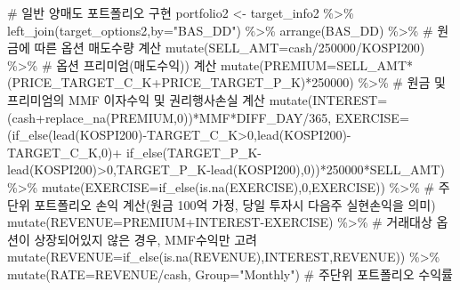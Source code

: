 \documentclass[
  a4paper,
  DIV=11,
  numbers=noendperiod]{scrreprt}
\newenvironment{Shaded}{\begin{snugshade}}{\end{snugshade}}
\newcommand{\AttributeTok}[1]{\textcolor[rgb]{0.40,0.45,0.13}{#1}}
\newcommand{\CommentTok}[1]{\textcolor[rgb]{0.37,0.37,0.37}{#1}}
\newcommand{\DecValTok}[1]{\textcolor[rgb]{0.68,0.00,0.00}{#1}}
\newcommand{\FunctionTok}[1]{\textcolor[rgb]{0.28,0.35,0.67}{#1}}
\newcommand{\NormalTok}[1]{\textcolor[rgb]{0.00,0.23,0.31}{#1}}
\newcommand{\OtherTok}[1]{\textcolor[rgb]{0.00,0.23,0.31}{#1}}
\newcommand{\SpecialCharTok}[1]{\textcolor[rgb]{0.37,0.37,0.37}{#1}}
\newcommand{\StringTok}[1]{\textcolor[rgb]{0.13,0.47,0.30}{#1}}
\begin{document}
\begin{Shaded}
\begin{Highlighting}[]
\CommentTok{\# 일반 양매도 포트폴리오 구현}
\NormalTok{portfolio2 }\OtherTok{\textless{}{-}}\NormalTok{ target\_info2 }\SpecialCharTok{\%\textgreater{}\%} 
  \FunctionTok{left\_join}\NormalTok{(target\_options2,}\AttributeTok{by=}\StringTok{"BAS\_DD"}\NormalTok{) }\SpecialCharTok{\%\textgreater{}\%} 
  \FunctionTok{arrange}\NormalTok{(BAS\_DD) }\SpecialCharTok{\%\textgreater{}\%} 
  \CommentTok{\# 원금에 따른 옵션 매도수량 계산}
  \FunctionTok{mutate}\NormalTok{(}\AttributeTok{SELL\_AMT=}\NormalTok{cash}\SpecialCharTok{/}\DecValTok{250000}\SpecialCharTok{/}\NormalTok{KOSPI200) }\SpecialCharTok{\%\textgreater{}\%} 
  \CommentTok{\# 옵션 프리미엄(매도수익)) 계산}
  \FunctionTok{mutate}\NormalTok{(}\AttributeTok{PREMIUM=}\NormalTok{SELL\_AMT}\SpecialCharTok{*}\NormalTok{(PRICE\_TARGET\_C\_K}\SpecialCharTok{+}\NormalTok{PRICE\_TARGET\_P\_K)}\SpecialCharTok{*}\DecValTok{250000}\NormalTok{) }\SpecialCharTok{\%\textgreater{}\%} 
  \CommentTok{\# 원금 및 프리미엄의 MMF 이자수익 및 권리행사손실 계산}
  \FunctionTok{mutate}\NormalTok{(}\AttributeTok{INTEREST=}\NormalTok{(cash}\SpecialCharTok{+}\FunctionTok{replace\_na}\NormalTok{(PREMIUM,}\DecValTok{0}\NormalTok{))}\SpecialCharTok{*}\NormalTok{MMF}\SpecialCharTok{*}\NormalTok{DIFF\_DAY}\SpecialCharTok{/}\DecValTok{365}\NormalTok{,}
         \AttributeTok{EXERCISE=}\NormalTok{(}\FunctionTok{if\_else}\NormalTok{(}\FunctionTok{lead}\NormalTok{(KOSPI200)}\SpecialCharTok{{-}}\NormalTok{TARGET\_C\_K}\SpecialCharTok{\textgreater{}}\DecValTok{0}\NormalTok{,}\FunctionTok{lead}\NormalTok{(KOSPI200)}\SpecialCharTok{{-}}\NormalTok{TARGET\_C\_K,}\DecValTok{0}\NormalTok{)}\SpecialCharTok{+}
                     \FunctionTok{if\_else}\NormalTok{(TARGET\_P\_K}\SpecialCharTok{{-}}\FunctionTok{lead}\NormalTok{(KOSPI200)}\SpecialCharTok{\textgreater{}}\DecValTok{0}\NormalTok{,TARGET\_P\_K}\SpecialCharTok{{-}}\FunctionTok{lead}\NormalTok{(KOSPI200),}\DecValTok{0}\NormalTok{))}\SpecialCharTok{*}\DecValTok{250000}\SpecialCharTok{*}\NormalTok{SELL\_AMT) }\SpecialCharTok{\%\textgreater{}\%} 
  \FunctionTok{mutate}\NormalTok{(}\AttributeTok{EXERCISE=}\FunctionTok{if\_else}\NormalTok{(}\FunctionTok{is.na}\NormalTok{(EXERCISE),}\DecValTok{0}\NormalTok{,EXERCISE)) }\SpecialCharTok{\%\textgreater{}\%} 
  \CommentTok{\# 주단위 포트폴리오 손익 계산(원금 100억 가정, 당일 투자시 다음주 실현손익을 의미)}
  \FunctionTok{mutate}\NormalTok{(}\AttributeTok{REVENUE=}\NormalTok{PREMIUM}\SpecialCharTok{+}\NormalTok{INTEREST}\SpecialCharTok{{-}}\NormalTok{EXERCISE) }\SpecialCharTok{\%\textgreater{}\%} 
  \CommentTok{\# 거래대상 옵션이 상장되어있지 않은 경우, MMF수익만 고려}
  \FunctionTok{mutate}\NormalTok{(}\AttributeTok{REVENUE=}\FunctionTok{if\_else}\NormalTok{(}\FunctionTok{is.na}\NormalTok{(REVENUE),INTEREST,REVENUE)) }\SpecialCharTok{\%\textgreater{}\%} 
  \FunctionTok{mutate}\NormalTok{(}\AttributeTok{RATE=}\NormalTok{REVENUE}\SpecialCharTok{/}\NormalTok{cash,}
         \AttributeTok{Group=}\StringTok{"Monthly"}\NormalTok{) }\CommentTok{\# 주단위 포트폴리오 수익률}


\end{Highlighting}
\end{Shaded}
\end{document}

